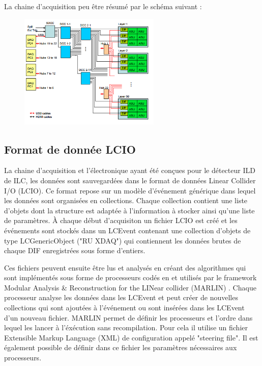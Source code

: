 La chaine d'acquisition peu être résumé par le schéma suivant : 
\begin{figure}[ht!]
	\centering
	\includegraphics[width=0.6\textwidth]{GLA/chaine.png}
\end{figure}

\subsection{Format de donnée LCIO}
La chaine d'acquisition et l'électronique ayant été conçues pour le détecteur ILD de ILC, les données sont sauvegardées dans le format de données Linear Collider I/O (LCIO)\cite{2003physics6114G}. Ce format repose sur un modèle d'événement générique  dans lequel les données sont organisées en collections. Chaque collection contient une liste d'objets dont la structure est adaptée à l'information à stocker ainsi qu'une liste de paramètres. À chaque début d'acquisiton un fichier LCIO est créé et les événements sont stockés dans un LCEvent contenant une collection d'objets de type LCGenericObject ("RU XDAQ") qui contiennent les données brutes de chaque DIF enregistrées sous forme d'entiers.

Ces fichiers peuvent ensuite être lus et analysés en créant des algorithmes qui sont implémentés sous forme de processeurs codés en \Cpp et utilisés par le framework Modular Analysis \& Reconstruction for the LINear collider (MARLIN) \cite{Gaede:2006pj}. Chaque processeur analyse les données dans les LCEvent et peut créer de nouvelles collections qui sont ajoutées à l'événement ou sont insérées dans les LCEvent d'un nouveau fichier. MARLIN permet de définir les processeurs et l'ordre dans lequel les lancer à l'éxécution sans recompilation. Pour cela il utilise un fichier Extensible Markup Language (XML) de configuration appelé "steering file". Il est également possible de définir dans ce fichier les paramètres nécessaires aux processeurs.

